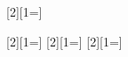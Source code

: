 \newcommand{\reffig}[1]{Figure \ref{fig:#1}\xspace}

\ifx\toreview\undefined
  [2][1=]{}
  \newcommand{\hl}[1]{}

  [2][1=]{}
  \newcommand{\hlhl}[1]{}
  [2][1=]{}
  \newcommand{\hlke}[1]{}
  [2][1=]{}
  \newcommand{\hlfa}[1]{}
\else
  \newcommand{\hl}[1]{\colorbox{red!25}{#1}}
  \newenvironment{highlight}{\begin{mdframed}[backgroundcolor=red!25]}{\end{mdframed}}




\fi